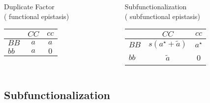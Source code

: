 \documentclass[11pt, aspectratio=169]{beamer}
\newcommand{\highlite}[1]{{\color{Carnellian} #1}}
\begin{document}
{\begin{columns}
\begin{column}{0.3\linewidth}
\begin{center}
Duplicate Factor \\
(\highlite{functional epistasis})
\end{center}
\begin{table}
\begin{tabular}{l|cc}
     & $CC$ & $cc$ \\ \hline 
  $BB$ & $a$ & $a$ \\ 
  $bb$ & $a$ & $0$ \\ 
  \end{tabular} 
\end{table}
\end{column}

\begin{column}{0.38\linewidth}
\pause
\begin{center}
Subfunctionalization \\
(\highlite{subfunctional epistasis})
\end{center}
\begin{table}
  \begin{tabular}{l|cc}
     & $CC$ & $cc$ \\ \hline 
  $BB$ & $s(a^\star + \tilde{a})$ & $a^\star$ \\ 
  $bb$ & $\tilde{a}$ & 0 \\ 
  \end{tabular} 
\end{table}

\end{column}
\end{columns}
}

\subsection{Subfunctionalization}
\end{document}
